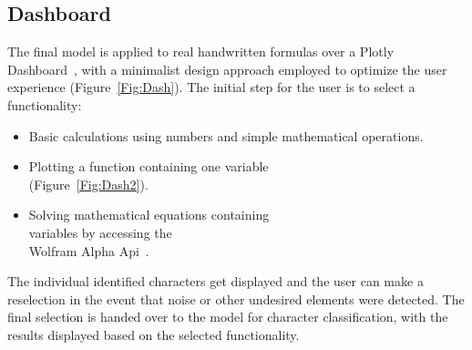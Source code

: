 \documentclass[@CLASSOPTIONS@]{tumarticle}
\begin{document}
\subsection{Dashboard}
\label{subsec:dash}
The final model is applied to real handwritten formulas over a Plotly Dashboard~\cite{plotly},
with a minimalist design approach employed to optimize the user experience (Figure~\ref{Fig:Dash}).
The initial step for the user is to select a functionality:
\begin{itemize}
\item Basic calculations using numbers and simple mathematical operations.
\item Plotting a function containing one variable\\ (Figure~\ref{Fig:Dash2}).
\item Solving mathematical equations containing\\variables by accessing the\\
Wolfram Alpha Api~\cite{wolfram}.
\end{itemize}
The individual identified characters get displayed and the user can make a reselection
in the event that noise or other undesired elements were detected.
The final selection is handed over to the model for character classification,
with the results displayed based on the selected functionality.
\end{document}

